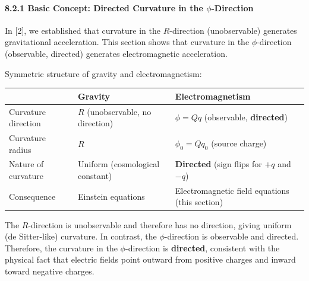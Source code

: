 \documentclass[a4paper,11pt]{article}
\theoremstyle{definition}
\begin{document}
\paragraph{\texorpdfstring{8.2.1 Basic Concept: Directed Curvature in the \(\phi\)-Direction}{8.2.1 Basic Concept: Directed Curvature in the \textbackslash phi-Direction}}\label{basic-concept-directed-curvature-in-the-phi-direction}

In {[}2{]}, we established that curvature in the \(R\)-direction (unobservable) generates gravitational acceleration. This section shows that curvature in the \(\phi\)-direction (observable, directed) generates electromagnetic acceleration.

Symmetric structure of gravity and electromagnetism:

{\def\LTcaptype{none} %
\begin{longtable}[]{@{}
  >{\raggedright\arraybackslash}p{}
  >{\raggedright\arraybackslash}p{}
  >{\raggedright\arraybackslash}p{}@{}}
\toprule\noalign{}
\begin{minipage}[b]{\linewidth}\raggedright
\end{minipage} & \begin{minipage}[b]{\linewidth}\raggedright
Gravity
\end{minipage} & \begin{minipage}[b]{\linewidth}\raggedright
Electromagnetism
\end{minipage} \\
\midrule\noalign{}
\endhead
\bottomrule\noalign{}
\endlastfoot
Curvature direction & \(R\) (unobservable, no direction) & \(\phi = Qq\) (observable, \textbf{directed}) \\
Curvature radius & \(R\) & \(\phi_0 = Qq_0\) (source charge) \\
Nature of curvature & Uniform (cosmological constant) & \textbf{Directed} (sign flips for \(+q\) and \(-q\)) \\
Consequence & Einstein equations & Electromagnetic field equations (this section) \\
\end{longtable}
}

The \(R\)-direction is unobservable and therefore has no direction, giving uniform (de Sitter-like) curvature. In contrast, the \(\phi\)-direction is observable and directed. Therefore, the curvature in the \(\phi\)-direction is \textbf{directed}, consistent with the physical fact that electric fields point outward from positive charges and inward toward negative charges.
\end{document}
